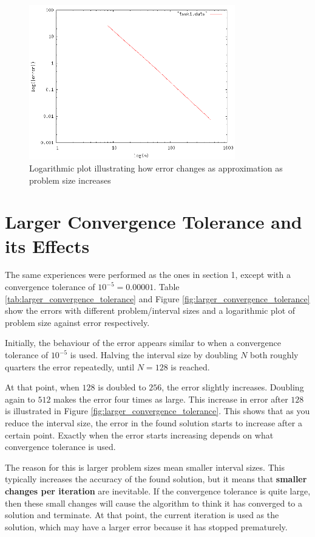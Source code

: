 \documentclass{article}
\begin{document}
\begin{figure}
	\centering
	\includegraphics[width=0.8\textwidth]{task1/task1_plot.png}
	\caption{Logarithmic plot illustrating how error changes as approximation as problem size increases}
	\label{fig:problem_size_growth}
\end{figure}

\section{Larger Convergence Tolerance and its Effects}

The same experiences were performed as the ones in section 1, except with a convergence tolerance of $10^{-5} = 0.00001$. Table \ref{tab:larger_convergence_tolerance} and Figure \ref{fig:larger_convergence_tolerance} show the errors with different problem/interval sizes and a logarithmic plot of problem size against error respectively.

Initially, the behaviour of the error appears similar to when a convergence tolerance of $10^{-5}$ is used. Halving the interval size by doubling $N$ both roughly quarters the error repeatedly, until $N = 128$ is reached.

At that point, when $128$ is doubled to $256$, the error slightly increases. Doubling again to $512$ makes the error four times as large. This increase in error after $128$ is illustrated in Figure \ref{fig:larger_convergence_tolerance}. This shows that as you reduce the interval size, the error in the found solution starts to increase after a certain point. Exactly when the error starts increasing depends on what convergence tolerance is used.

The reason for this is larger problem sizes mean smaller interval sizes. This typically increases the accuracy of the found solution, but it means that \textbf{smaller changes per iteration} are inevitable. If the convergence tolerance is quite large, then these small changes will cause the algorithm to think it has converged to a solution and terminate. At that point, the current iteration is used as the solution, which may have a larger error because it has stopped prematurely.
\end{document}
